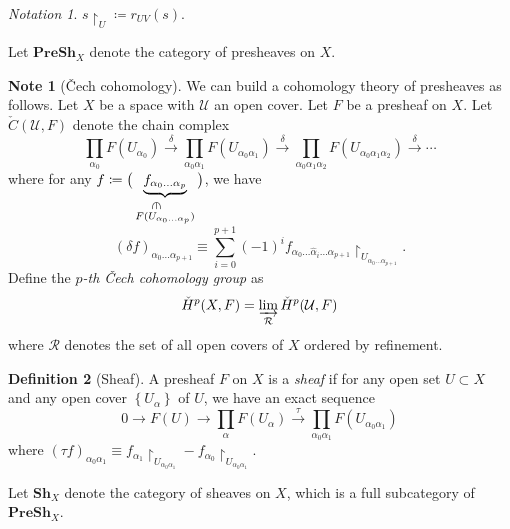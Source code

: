 \documentclass[10pt,letterpaper,cm]{nupset}
\theoremstyle{definition}
\newtheorem{definition}{Definition}[subsection]
\newtheorem{note}[definition]{Note}
\theoremstyle{theorem}
\theoremstyle{remark}
\newtheorem*{notation}{Notation}
\newcommand{\1}{\mathbb{1}}
\newcommand{\0}{\vec 0}
\begin{document}
\begin{notation}
$s \restriction_U \coloneqq r_{UV}(s)$.
\end{notation}

\smallskip

Let $\mathbf{PreSh}_X$ denote the category of presheaves on $X$.

\newcommand{\invin}{%
\mathrel{\reflectbox{\rotatebox[origin=c]{270}{$\in$}}}}

\begin{note}[\v{C}ech cohomology]
We can build a cohomology theory of presheaves as follows. Let $X$ be a space with $\mathcal{U}$ an open cover. Let $F$ be a presheaf on $X$.  Let $\check{C}(\mathcal{U}, F)$ denote the chain complex
$$   \prod_{\alpha_0}F(U_{\alpha_0}) \overset{\delta}{\longrightarrow} \prod_{\alpha_0\alpha_1} F(U_{\alpha_0 \alpha_1}) \overset{\delta}{\longrightarrow} \prod_{\alpha_0\alpha_1\alpha_2}F(U_{\alpha_0\alpha_1\alpha_2}) \overset{\delta}{\longrightarrow} \cdots 
$$  where for any $f \coloneqq \big(\underbrace{f_{\alpha_0\ldots \alpha_p}}_{\overset{\invin}{F(U_{\alpha_0\ldots \alpha_p})}}\big)$, we have $$\left(\delta{f}\right)_{\alpha_0 \ldots \alpha_{p+1}} \equiv \sum_{i=0}^{p+1} ({-1})^i f_{\alpha_0 \ldots \hat{\alpha}_i \ldots \alpha_{p+1}} \restriction_{U_{\alpha_0\ldots \alpha_{p+1}}}.$$ Define the \textit{$p$-th \v{C}ech cohomology group} as $$\check{H}^p(X, F) = \varinjlim_{\mathcal{R}} \check{H}^p(\mathcal{U}, F)  $$ where $\mathcal{R}$ denotes the set of all open covers of $X$ ordered by refinement. 
\end{note}

\smallskip

\begin{definition}[Sheaf]
A presheaf $F$ on $X$ is a \textit{sheaf} if for any open set $U \subset X$ and any open cover $\left\{U_{\alpha}\right\}$ of $U$, we have an exact sequence $$    0 \to F(U) \to \prod_{\alpha} F(U_{\alpha}) \overset{\tau}{\longrightarrow} \prod _{\alpha_0\alpha_1} F(U_{\alpha_0 \alpha_1})  $$ where $\left(\tau{f}\right)_{\alpha_0 \alpha_1} \equiv f_{\alpha_1}\restriction_{U_{\alpha_0\alpha_1}} - f_{\alpha_0} \restriction_{U_{\alpha_0\alpha_1}}$.
\end{definition}

Let $\mathbf{Sh}_{X}$ denote the category of sheaves on $X$, which is a full subcategory of $\mathbf{PreSh}_X$.
\end{document}
